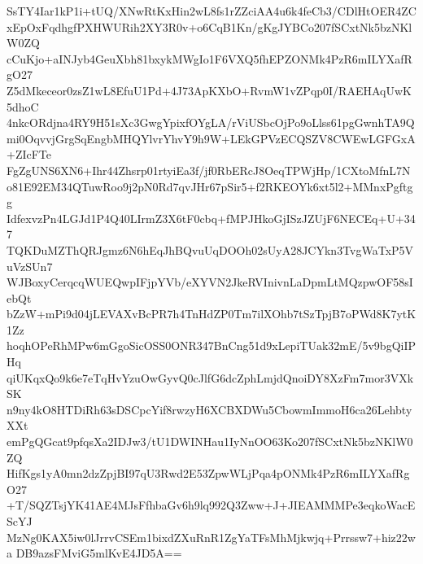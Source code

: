 SsTY4Iar1kP1i+tUQ/XNwRtKxHin2wL8fs1rZZciAA4u6k4feCb3/CDlHtOER4ZC
xEpOxFqdhgfPXHWURih2XY3R0v+o6CqB1Kn/gKgJYBCo207fSCxtNk5bzNKlW0ZQ
cCuKjo+aINJyb4GeuXbh81bxykMWgIo1F6VXQ5fhEPZONMk4PzR6mILYXafRgO27
Z5dMkeceor0zsZ1wL8EfuU1Pd+4J73ApKXbO+RvmW1vZPqp0I/RAEHAqUwK5dhoC
4nkcORdjna4RY9H51sXc3GwgYpixfOYgLA/rViUSbcOjPo9oLlss61pgGwnhTA9Q
mi0OqvvjGrgSqEngbMHQYlvrYhvY9h9W+LEkGPVzECQSZV8CWEwLGFGxA+ZIcFTe
FgZgUNS6XN6+Ihr44Zhsrp01rtyiEa3f/jf0RbERcJ8OeqTPWjHp/1CXtoMfnL7N
o81E92EM34QTuwRoo9j2pN0Rd7qvJHr67pSir5+f2RKEOYk6xt5l2+MMnxPgftgg
IdfexvzPn4LGJd1P4Q40LIrmZ3X6tF0cbq+fMPJHkoGjISzJZUjF6NECEq+U+347
TQKDuMZThQRJgmz6N6hEqJhBQvuUqDOOh02sUyA28JCYkn3TvgWaTxP5VuVzSUn7
WJBoxyCerqcqWUEQwpIFjpYVb/eXYVN2JkeRVInivnLaDpmLtMQzpwOF58sIebQt
bZzW+mPi9d04jLEVAXvBcPR7h4TnHdZP0Tm7ilXOhb7tSzTpjB7oPWd8K7ytK1Zz
hoqhOPeRhMPw6mGgoSicOSS0ONR347BnCng51d9xLepiTUak32mE/5v9bgQiIPHq
qiUKqxQo9k6e7eTqHvYzuOwGyvQ0cJlfG6dcZphLmjdQnoiDY8XzFm7mor3VXkSK
n9ny4kO8HTDiRh63sDSCpcYif8rwzyH6XCBXDWu5CbowmImmoH6ca26LehbtyXXt
emPgQGcat9pfqsXa2IDJw3/tU1DWINHau1IyNnOO63Ko207fSCxtNk5bzNKlW0ZQ
HifKgs1yA0mn2dzZpjBI97qU3Rwd2E53ZpwWLjPqa4pONMk4PzR6mILYXafRgO27
+T/SQZTsjYK41AE4MJsFfhbaGv6h9lq992Q3Zww+J+JIEAMMMPe3eqkoWacEScYJ
MzNg0KAX5iw0lJrrvCSEm1bixdZXuRnR1ZgYaTFsMhMjkwjq+Prrssw7+hiz22wa
DB9azsFMviG5mlKvE4JD5A==
